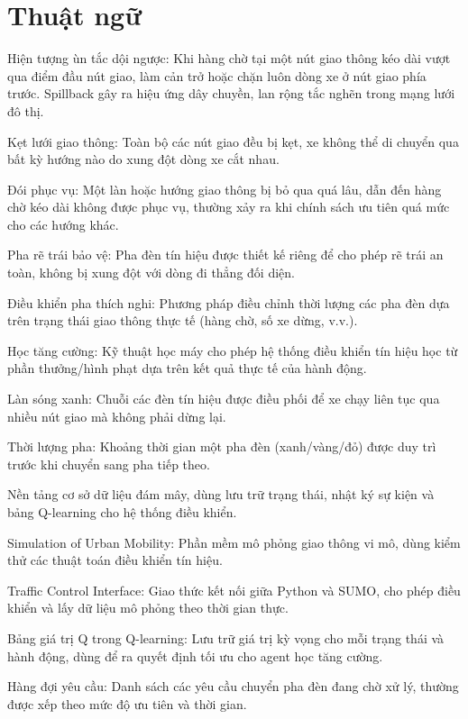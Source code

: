 \chapter{Thuật ngữ}

\begin{description}[leftmargin=2.5em,style=nextline]
    \item[\textbf{Spillback}] Hiện tượng ùn tắc dội ngược: Khi hàng chờ tại một nút giao thông kéo dài vượt qua điểm đầu nút giao, làm cản trở hoặc chặn luôn dòng xe ở nút giao phía trước. Spillback gây ra hiệu ứng dây chuyền, lan rộng tắc nghẽn trong mạng lưới đô thị.
    \item[\textbf{Gridlock}] Kẹt lưới giao thông: Toàn bộ các nút giao đều bị kẹt, xe không thể di chuyển qua bất kỳ hướng nào do xung đột dòng xe cắt nhau.
    \item[\textbf{Starvation}] Đói phục vụ: Một làn hoặc hướng giao thông bị bỏ qua quá lâu, dẫn đến hàng chờ kéo dài không được phục vụ, thường xảy ra khi chính sách ưu tiên quá mức cho các hướng khác.
    \item[\textbf{Protected left}] Pha rẽ trái bảo vệ: Pha đèn tín hiệu được thiết kế riêng để cho phép rẽ trái an toàn, không bị xung đột với dòng đi thẳng đối diện.
    \item[\textbf{Adaptive Phase Control (APC)}] Điều khiển pha thích nghi: Phương pháp điều chỉnh thời lượng các pha đèn dựa trên trạng thái giao thông thực tế (hàng chờ, số xe dừng, v.v.).
    \item[\textbf{Reinforcement Learning (RL)}] Học tăng cường: Kỹ thuật học máy cho phép hệ thống điều khiển tín hiệu học từ phần thưởng/hình phạt dựa trên kết quả thực tế của hành động.
    \item[\textbf{Green wave}] Làn sóng xanh: Chuỗi các đèn tín hiệu được điều phối để xe chạy liên tục qua nhiều nút giao mà không phải dừng lại.
    \item[\textbf{Phase duration}] Thời lượng pha: Khoảng thời gian một pha đèn (xanh/vàng/đỏ) được duy trì trước khi chuyển sang pha tiếp theo.
    \item[\textbf{Supabase}] Nền tảng cơ sở dữ liệu đám mây, dùng lưu trữ trạng thái, nhật ký sự kiện và bảng Q-learning cho hệ thống điều khiển.
    \item[\textbf{SUMO}] Simulation of Urban Mobility: Phần mềm mô phỏng giao thông vi mô, dùng kiểm thử các thuật toán điều khiển tín hiệu.
    \item[\textbf{TraCI}] Traffic Control Interface: Giao thức kết nối giữa Python và SUMO, cho phép điều khiển và lấy dữ liệu mô phỏng theo thời gian thực.
    \item[\textbf{Q-table}] Bảng giá trị Q trong Q-learning: Lưu trữ giá trị kỳ vọng cho mỗi trạng thái và hành động, dùng để ra quyết định tối ưu cho agent học tăng cường.
    \item[\textbf{Pending requests}] Hàng đợi yêu cầu: Danh sách các yêu cầu chuyển pha đèn đang chờ xử lý, thường được xếp theo mức độ ưu tiên và thời gian.
\end{description}